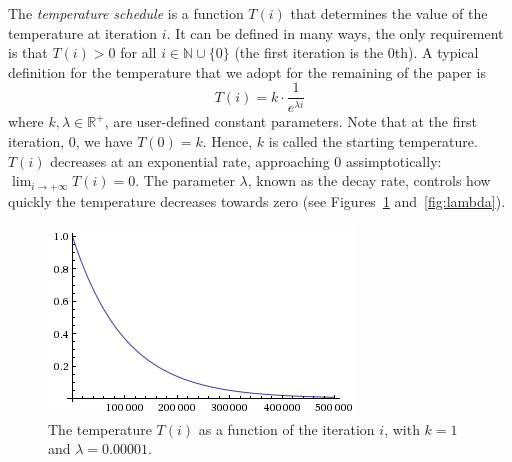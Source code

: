 \documentclass[]{article}
\begin{document}
The \textit{temperature schedule} is a function $T(i)$ that determines the value of the temperature at iteration $i$. It can be defined in many ways, the only requirement is that $T(i)>0$ for all $i\in\mathbb{N}\cup\{0\}$ (the first iteration is the 0th). A typical definition for the temperature that we adopt for the remaining of the paper is
$$T(i)=k\cdot\frac{1}{e^{\lambda i}}$$
where $k,\lambda\in \mathbb{R}^+$, are user-defined constant parameters. Note that at the first iteration, $0$, we have $T(0)=k$. Hence, $k$ is called the starting temperature. $T(i)$ decreases at an exponential rate, approaching $0$ assimptotically: $\lim_{i\rightarrow +\infty} T(i)=0$. The parameter $\lambda$, known as the decay rate, controls how quickly the temperature decreases towards zero (see Figures~\ref{fig:temp} and~\ref{fig:lambda}).

\begin{figure}
\centering
\includegraphics[width=0.99\linewidth]{../figures/plottemp}
\caption[Temperature schedule]{The temperature $T(i)$ as a function of the iteration $i$, with $k=1$ and $\lambda=0.00001$.}
\label{fig:temp}
\end{figure}
\end{document}

